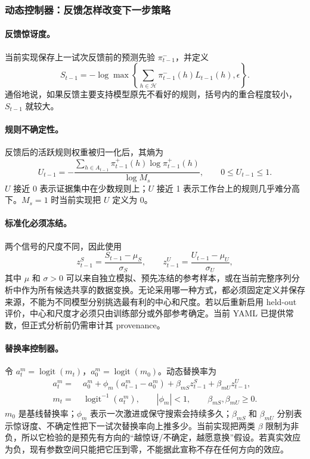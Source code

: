 \subsubsection{动态控制器：反馈怎样改变下一步策略}

\paragraph{反馈惊讶度。}
当前实现保存上一试次反馈前的预测先验 $\pi^-_{t-1}$，并定义
\begin{equation}
S_{t-1}
=-\log\max\!\left\{
\sum_{h\in\mathcal H}\pi^-_{t-1}(h)L_{t-1}(h),
\epsilon
\right\}.
\label{eq:model0809-surprise}
\end{equation}
通俗地说，如果反馈主要支持模型原先不看好的规则，括号内的重合程度较小，$S_{t-1}$ 就较大。

\paragraph{规则不确定性。}
反馈后的活跃规则权重被归一化后，其熵为
\begin{equation}
U_{t-1}
=-\frac{\sum_{h\in A_{t-1}}
\pi^+_{t-1}(h)\log\pi^+_{t-1}(h)}{\log M_s},
\qquad 0\leq U_{t-1}\leq1.
\label{eq:model0809-uncertainty}
\end{equation}
$U$ 接近 0 表示证据集中在少数规则上；$U$ 接近 1 表示工作台上的规则几乎难分高下。$M_s=1$ 时当前实现把 $U$ 定义为 0。

\paragraph{标准化必须冻结。}
两个信号的尺度不同，因此使用
\begin{equation}
z^S_{t-1}=\frac{S_{t-1}-\mu_S}{\sigma_S},
\qquad
z^U_{t-1}=\frac{U_{t-1}-\mu_U}{\sigma_U},
\label{eq:model0809-standardization}
\end{equation}
其中 $\mu$ 和 $\sigma>0$ 可以来自独立模拟、预先冻结的参考样本，或在当前完整序列分析中作为所有候选共享的数据变换。无论采用哪一种方式，都必须固定定义并保存来源，不能为不同模型分别挑选最有利的中心和尺度。若以后重新启用 held-out 评价，中心和尺度才必须只由训练部分或外部参考确定。当前 YAML 已提供常数，但正式分析前仍需审计其 provenance。

\paragraph{替换率控制器。}
令 $a^m_t=\operatorname{logit}(m_t)$，$a^m_0=\operatorname{logit}(m_0)$。动态替换率为
\begin{align}
a^m_t
=\;&a^m_0+\phi_m(a^m_{t-1}-a^m_0)
+\beta_{mS}z^S_{t-1}+\beta_{mU}z^U_{t-1},
\nonumber\\
m_t
=\;&\operatorname{logit}^{-1}(a^m_t),
\qquad |\phi_m|<1,
\qquad \beta_{mS},\beta_{mU}\geq0.
\label{eq:model0809-rate-controller}
\end{align}
$m_0$ 是基线替换率；$\phi_m$ 表示一次激进或保守搜索会持续多久；$\beta_{mS}$ 和 $\beta_{mU}$ 分别表示惊讶度、不确定性把下一试次替换率向上推多少。当前实现把两类 $\beta$ 限制为非负，所以它检验的是预先有方向的“越惊讶/不确定，越愿意换”假设。若真实效应为负，现有参数空间只能把它压到零，不能据此宣称不存在任何方向的效应。

